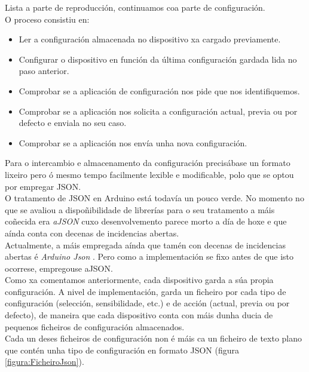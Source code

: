    Lista a parte de reproducción, continuamos coa parte de configuración. \\
   
   O proceso consistiu en:
    
   \begin{itemize}
    \item Ler a configuración almacenada no dispositivo xa cargado previamente.
    \item Configurar o dispositivo en función da última configuración gardada
        lida no paso anterior.
    \item Comprobar se a aplicación de configuración nos pide que nos
        identifiquemos.
    \item Comprobar se a aplicación nos solicita a configuración actual, previa
        ou por defecto e enviala no seu caso.
    \item Comprobar se a aplicación nos envía unha nova configuración.
   \end{itemize}
   
   Para o intercambio e almacenamento da configuración precisábase un formato
   lixeiro pero ó mesmo tempo facilmente lexible e modificable, polo que se
   optou por empregar JSON. \\
   
   O tratamento de JSON en Arduino está todavía un pouco verde. No momento no
   que se avaliou a dispoñibilidade de librerías para o seu tratamento a máis
   coñecida era \textit{aJSON} \cite{aJSON} cuxo desenvolvemento parece morto
   a día de hoxe e que aínda conta con decenas de incidencias abertas. \\
   
   Actualmente, a máis empregada aínda que tamén con decenas de incidencias
   abertas é \textit{Arduino Json} \cite{ArduinoJson}. Pero como a
   implementación se fixo antes de que isto ocorrese, empregouse aJSON. \\
   
   Como xa comentamos anteriormente, cada dispositivo garda a súa propia
   configuración. A nivel de implementación, garda un ficheiro por cada tipo de
   configuración (selección, sensibilidade, etc.) e de acción (actual, previa ou
   por defecto), de maneira que cada dispositivo conta con máis dunha ducia de
   pequenos ficheiros de configuración almacenados. \\
   
   Cada un deses ficheiros de configuración non é máis ca un ficheiro de texto
   plano que contén unha tipo de configuración en formato JSON (figura
   \ref{figura:FicheiroJson}). \\
   

